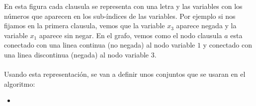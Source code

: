 En esta figura cada clausula se representa con una letra y las variables con los números que aparecen en los sub-índices de las variables. Por ejemplo si nos fijamos en la primera clausula, vemos que la variable $x_3$ aparece negada y la variable $x_1$ aparece sin negar. En el grafo, vemos como el nodo clausula $a$ esta conectado con una linea continua (no negada) al nodo variable $1$ y conectado con una linea discontinua (negada) al nodo variable $3$. \\\\
Usando esta representación, se van a definir unos conjuntos que se usaran en el algoritmo: 
\begin{itemize}
	\item
\end{itemize}